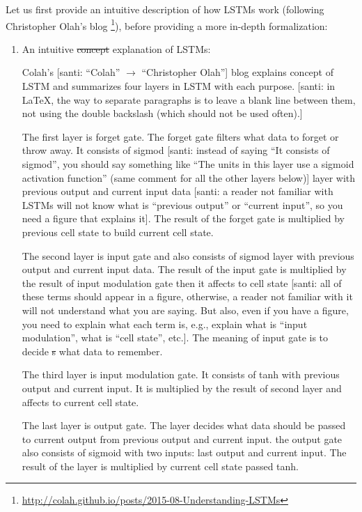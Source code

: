 \documentclass[draft,dvipsnames]{drexel-thesis}
\begin{document}
\begin{thesis}
\begin{enumerate}
	{\color{blue} Let us first provide an intuitive description of how LSTMs work (following Christopher Olah's blog \footnote{\url{http://colah.github.io/posts/2015-08-Understanding-LSTMs}}), before providing a more in-depth formalization}:
	
	\begin{enumerate}
	\item An intuitive {\color{red} \st{concept} explanation} of LSTM{\color{red}s}:
	
		Colah's {\color{red} [santi: ``Colah'' $\to$ ``Christopher Olah'']} blog explains concept of LSTM and summarizes four layers in LSTM with each purpose. {\color{red} [santi: in LaTeX, the way to separate paragraphs is to leave a blank line between them, not using the double backslash (which should not be used often).]}
		
		The first layer is forget gate. The forget gate filters what data to forget or throw away. It consists of sigmod {\color{red} [santi: instead of saying ``It consists of sigmod'', you should say something like ``The units in this layer use a sigmoid activation function'' (same comment for all the other layers below)]} layer with previous output and current input data {\color{red} [santi: a reader not familiar with LSTMs will not know what is ``previous output'' or ``current input'', so you need a figure that explains it]}. The result of the forget gate is multiplied by previous cell state to build current cell state.
		
		The second layer is input gate and also consists of sigmod layer with previous output and current input data. The result of the input gate is multiplied by the result of input modulation gate then it affects to cell state {\color{red} [santi: all of these terms should appear in a figure, otherwise, a reader not familiar with it will not understand what you are saying. But also, even if you have a figure, you need to explain what each term is, e.g., explain what is ``input modulation'', what is ``cell state'', etc.]}. The meaning of input gate is to decide{\color{red} \st{s}} what data to remember.
		
		The third layer is input modulation gate. It consists of tanh with previous output and current input. It is multiplied by the result of second layer and affects to current cell state.
		
		The last layer is output gate. The layer decides what data should be passed to current output from previous output and current input. the output gate also consists of sigmoid with two inputs: last output and current input. The result of the layer is multiplied by current cell state passed tanh.
	

\end{enumerate}
\end{enumerate}
\end{thesis}
\end{document}
